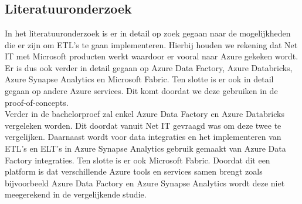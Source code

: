 
\chapter{}%
\label{ch:methodologie}


\section{Literatuuronderzoek}

In het literatuuronderzoek is er in detail op zoek gegaan naar de mogelijkheden die er zijn om ETL's te gaan implementeren. Hierbij houden we rekening dat Net IT met Microsoft producten werkt waardoor er vooral naar Azure gekeken wordt. Er is dus ook verder in detail gegaan op Azure Data Factory, Azure Databricks, Azure Synapse Analytics en Microsoft Fabric. Ten slotte is er ook in detail gegaan op andere Azure services. Dit komt doordat we deze gebruiken in de proof-of-concepts.\\

Verder in de bachelorproef zal enkel Azure Data Factory en Azure Databricks vergeleken worden. Dit doordat vanuit Net IT gevraagd was om deze twee te vergelijken. Daarnaast wordt voor data integraties en het implementeren van ETL's en ELT's in Azure Synapse Analytics gebruik gemaakt van Azure Data Factory integraties. Ten slotte is er ook Microsoft Fabric. Doordat dit een platform is dat verschillende Azure tools en services samen brengt zoals bijvoorbeeld Azure Data Factory en Azure Synapse Analytics wordt deze niet meegerekend in de vergelijkende studie.

